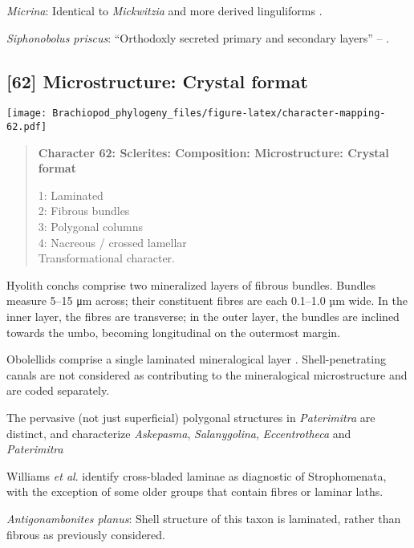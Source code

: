 \documentclass[openany]{book}
\theoremstyle{definition}
\theoremstyle{definition}
\theoremstyle{definition}
\theoremstyle{remark}
\begin{document}
\hypertarget{Micrina-coding-61}{}
\emph{Micrina}: Identical to \emph{Mickwitzia} and more derived
linguliforms \citep{Holmer2011Firstrecord}.

\hypertarget{Siphonobolus_priscus-coding-61}{}
\emph{Siphonobolus priscus}: ``Orthodoxly secreted primary and secondary
layers'' -- \citet{Williams2004Chemicostructure}.

\subsection*{{[}62{]} Microstructure: Crystal
format}\label{microstructure-crystal-format}

\texttt{[image: Brachiopod\_phylogeny\_files/figure-latex/character-mapping-62.pdf]}

\begin{quote}
\textbf{Character 62: Sclerites: Composition: Microstructure: Crystal
format}

1: Laminated\\
2: Fibrous bundles\\
3: Polygonal columns\\
4: Nacreous / crossed lamellar\\
Transformational character.
\end{quote}

Hyolith conchs comprise two mineralized layers of fibrous bundles.
Bundles measure 5--15 μm across; their constituent fibres are each
0.1--1.0 µm wide. In the inner layer, the fibres are transverse; in the
outer layer, the bundles are inclined towards the umbo, becoming
longitudinal on the outermost margin.

Obolellids comprise a single laminated mineralogical layer
\citep{Balthasar2008iMummpikia}. Shell-penetrating canals are not
considered as contributing to the mineralogical microstructure and are
coded separately.

The pervasive (not just superficial) polygonal structures in
\emph{Paterimitra} are distinct, and characterize \emph{Askepasma},
\emph{Salanygolina}, \emph{Eccentrotheca} and \emph{Paterimitra}
\citep{Larsson2014iPaterimitra}

Williams \emph{et al}.
\citeyearpar{Williams2000LinguliformeaCraniiformea} identify
cross-bladed laminae as diagnostic of Strophomenata, with the exception
of some older groups that contain fibres or laminar laths.

\hypertarget{Antigonambonites_planus-coding-62}{}
\emph{Antigonambonites planus}: Shell structure of this taxon is
laminated, rather than fibrous as previously considered.
\end{document}
